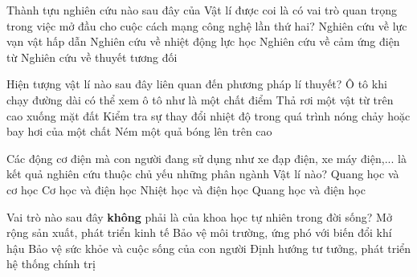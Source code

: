 \begin{ex}%
Thành tựu nghiên cứu nào sau đây của Vật lí được coi là có vai trò quan trọng trong việc mở đầu cho cuộc cách mạng công nghệ lần thứ hai?
\choice
{Nghiên cứu về lực vạn vật hấp dẫn}
{Nghiên cứu về nhiệt động lực học}
{\True Nghiên cứu về cảm ứng điện từ}
{Nghiên cứu về thuyết tương đối}
\loigiai{

}
\end{ex}
\begin{ex}%
Hiện tượng vật lí nào sau đây liên quan đến phương pháp lí thuyết?
\choice
{\True Ô tô khi chạy đường dài có thể xem ô tô như là một chất điểm}
{Thả rơi một vật từ trên cao xuống mặt đất}
{Kiểm tra sự thay đổi nhiệt độ trong quá trình nóng chảy hoặc bay hơi của một chất}
{Ném một quả bóng lên trên cao}
\loigiai{

}
\end{ex}
\begin{ex}%
Các động cơ điện mà con người đang sử dụng như xe đạp điện, xe máy điện,... là kết quả nghiên cứu thuộc chủ yếu những phân ngành Vật lí nào?
\choice
{Quang học và cơ học}
{\True Cơ học và điện học}
{Nhiệt học và điện học}
{Quang học và điện học}
\loigiai{

}
\end{ex}

\begin{ex}%
Vai trò nào sau đây \textbf{không} phải là của khoa học tự nhiên trong đời sống?
\choice
{Mở rộng sản xuất, phát triển kinh tế}
{Bảo vệ môi trường, ứng phó với biến đổi khí hậu}
{Bảo vệ sức khỏe và cuộc sống của con người}
{\True Định hướng tư tưởng, phát triển hệ thống chính trị}

\loigiai{

}
\end{ex}










